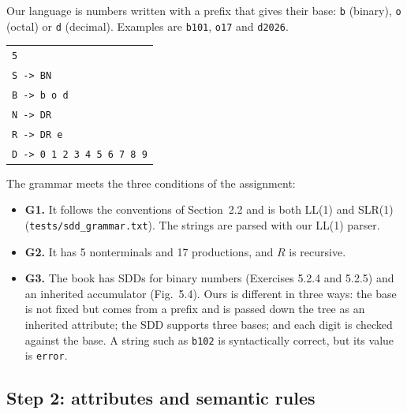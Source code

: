 \documentclass[11pt,a4paper]{article}
\newcommand{\code}[1]{\texttt{#1}}
\begin{document}
Our language is numbers written with a prefix that gives their base: \code{b} (binary), \code{o} (octal) or
\code{d} (decimal). Examples are \code{b101}, \code{o17} and \code{d2026}.
\begin{center}
\begin{tabular}{l}
\code{5}\\
\code{S -> BN}\\
\code{B -> b o d}\\
\code{N -> DR}\\
\code{R -> DR e}\\
\code{D -> 0 1 2 3 4 5 6 7 8 9}
\end{tabular}
\end{center}
The grammar meets the three conditions of the assignment:
\begin{itemize}
  \item \textbf{G1.} It follows the conventions of Section~2.2 and is both LL(1) and SLR(1) (\code{tests/sdd\_grammar.txt}). The strings are parsed with our LL(1) parser.
  \item \textbf{G2.} It has 5 nonterminals and 17 productions, and $R$ is recursive.
  \item \textbf{G3.} The book has SDDs for binary numbers (Exercises 5.2.4 and 5.2.5) and an inherited accumulator (Fig.~5.4). Ours is different in three ways: the base is not fixed but comes from a prefix and is passed down the tree as an inherited attribute; the SDD supports three bases; and each digit is checked against the base. A string such as \code{b102} is syntactically correct, but its value is \code{error}.
\end{itemize}

\subsection{Step 2: attributes and semantic rules}
\end{document}
